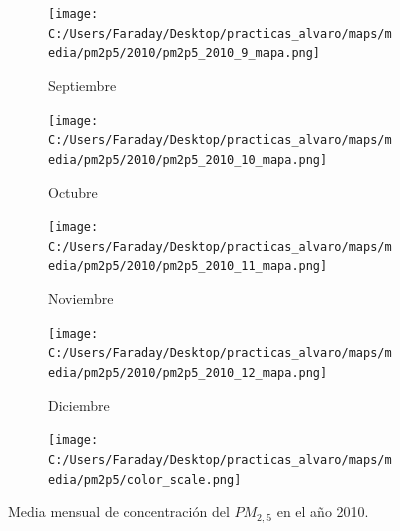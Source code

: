 \documentclass[12pt]{beamer}
\begin{document}
\begin{frame}[squeeze]
\begin{figure}[H]
\begin{subfigure}[H]{0.20\textwidth}
\texttt{[image: C:/Users/Faraday/Desktop/practicas\_alvaro/maps/media/pm2p5/2010/pm2p5\_2010\_9\_mapa.png]}
\captionsetup{labelformat=empty}
\caption{\scriptsize Septiembre}
\label{fig:map-pm2p5-2010-9}
\end{subfigure}
%
\begin{subfigure}[H]{0.20\textwidth}
\texttt{[image: C:/Users/Faraday/Desktop/practicas\_alvaro/maps/media/pm2p5/2010/pm2p5\_2010\_10\_mapa.png]}
\captionsetup{labelformat=empty}
\caption{\scriptsize Octubre}
\label{fig:map-pm2p5-2010-10}
\end{subfigure}
%
\begin{subfigure}[H]{0.20\textwidth}
\texttt{[image: C:/Users/Faraday/Desktop/practicas\_alvaro/maps/media/pm2p5/2010/pm2p5\_2010\_11\_mapa.png]}
\captionsetup{labelformat=empty}
\caption{\scriptsize Noviembre}
\label{fig:map-pm2p5-2010-11}
\end{subfigure}
%
\begin{subfigure}[H]{0.20\textwidth}
\texttt{[image: C:/Users/Faraday/Desktop/practicas\_alvaro/maps/media/pm2p5/2010/pm2p5\_2010\_12\_mapa.png]}
\captionsetup{labelformat=empty}
\caption{\scriptsize Diciembre}
\label{fig:map-pm2p5-2010-12}
\end{subfigure}

\begin{subfigure}[H]{0.45\textwidth}
\texttt{[image: C:/Users/Faraday/Desktop/practicas\_alvaro/maps/media/pm2p5/color\_scale.png]}
\captionsetup{labelformat=empty}
\caption{}
\end{subfigure}

\vspace*{-7mm}
\caption{\scriptsize Media mensual de concentración del $PM_{2,5}$ en el año 2010.}
\label{fig:map-pm2p5-2010}
\end{figure}
\end{frame}
\end{document}
